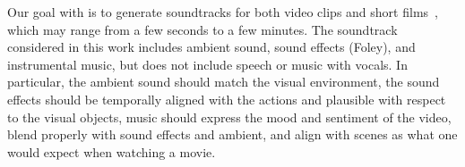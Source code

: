 Our goal with \OursAudio is to generate soundtracks for both video clips and short films~\citep{holman2012sound},
which may range from a few seconds to a few minutes.
The soundtrack considered in this work includes ambient sound, sound effects (Foley), and instrumental music,
but does not include speech or music with vocals.
In particular, the ambient sound should match the visual environment,
the sound effects should be temporally aligned with the actions and plausible with respect to the visual objects,
music should express the mood and sentiment of the video,
blend properly with sound effects and ambient,
and align with scenes as what one would expect when watching a movie.







